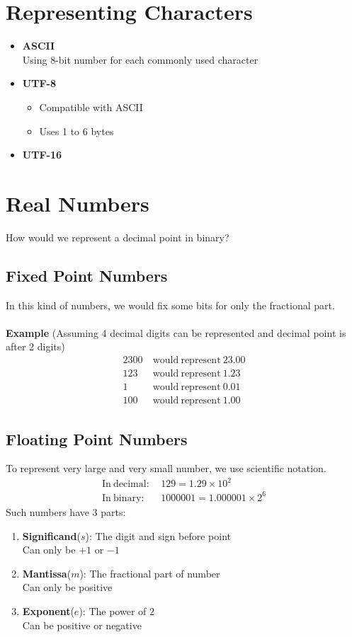 \documentclass[oneside]{book}
\begin{document}
\section{Representing Characters}
\begin{itemize}
	\item \textbf{ASCII}\\
	      Using 8-bit number for each commonly used character
	\item \textbf{UTF-8}
	      \begin{itemize}
		      \item Compatible with ASCII
		      \item Uses 1 to 6 bytes
	      \end{itemize}
	\item \textbf{UTF-16}
\end{itemize}

\section{Real Numbers}
How would we represent a decimal point in binary?
\subsection{Fixed Point Numbers}
In this kind of numbers, we would fix some bits for only the fractional part.
\\\\
\noindent\textbf{Example} (Assuming 4 decimal digits can be represented and decimal point is after 2 digits)
\begin{align*}
	2300 & \ \mathrm{would\ represent}\ 23.00 \\
	123  & \ \mathrm{would\ represent}\ 1.23  \\
	1    & \ \mathrm{would\ represent}\ 0.01  \\
	100  & \ \mathrm{would\ represent}\ 1.00
\end{align*}

\subsection{Floating Point Numbers}
To represent very large and very small number, we use scientific notation.
\begin{align*}
	\mathrm{In\ decimal:}\  & 129 = 1.29 \times 10^2        \\
	\mathrm{In\ binary:}\   & 1000001 = 1.000001 \times 2^6
\end{align*}
Such numbers have 3 parts:
\begin{enumerate}
	\item \textbf{Significand}($s$): The digit and sign before point\\
	      Can only be $+1$ or $-1$
	\item \textbf{Mantissa}($m$): The fractional part of number\\
	      Can only be positive
	\item \textbf{Exponent}($e$): The power of $2$\\
	      Can be positive or negative
\end{enumerate}
\end{document}
